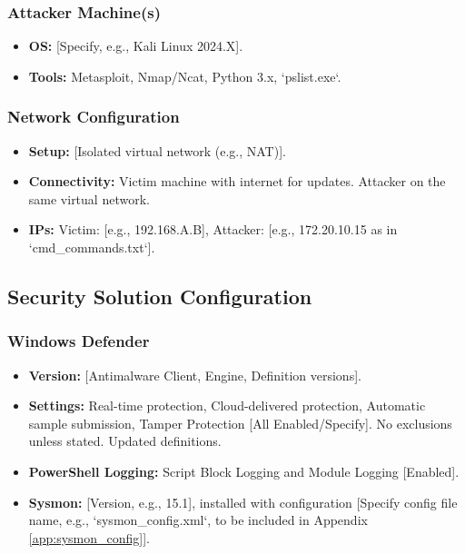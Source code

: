 \documentclass[11pt]{article}
\begin{document}
	\subsubsection{Attacker Machine(s)}
	\begin{itemize}
		\item \textbf{OS:} [Specify, e.g., Kali Linux 2024.X].
		\item \textbf{Tools:} Metasploit, Nmap/Ncat, Python 3.x, `pslist.exe`.
	\end{itemize}
	\subsubsection{Network Configuration}
	\begin{itemize}
		\item \textbf{Setup:} [Isolated virtual network (e.g., NAT)].
		\item \textbf{Connectivity:} Victim machine with internet for updates. Attacker on the same virtual network.
		\item \textbf{IPs:} Victim: [e.g., 192.168.A.B], Attacker: [e.g., 172.20.10.15 as in `cmd_commands.txt`].
	\end{itemize}
	
	\subsection{Security Solution Configuration}
	\subsubsection{Windows Defender}
	\begin{itemize}
		\item \textbf{Version:} [Antimalware Client, Engine, Definition versions].
		\item \textbf{Settings:} Real-time protection, Cloud-delivered protection, Automatic sample submission, Tamper Protection [All Enabled/Specify]. No exclusions unless stated. Updated definitions.
		\item \textbf{PowerShell Logging:} Script Block Logging and Module Logging [Enabled].
		\item \textbf{Sysmon:} [Version, e.g., 15.1], installed with configuration [Specify config file name, e.g., `sysmon_config.xml`, to be included in Appendix \ref{app:sysmon_config}].
	\end{itemize}
	
\end{document}
